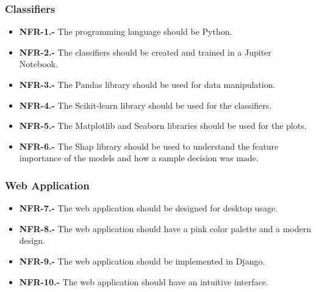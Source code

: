 \subsubsection{Classifiers}

\begin{itemize}
    \item \textbf{NFR-1.-} The programming language should be Python.
    \item \textbf{NFR-2.-} The classifiers should be created and trained in a Jupiter Notebook.
    \item \textbf{NFR-3.-} The Pandas library should be used for data manipulation.
    \item \textbf{NFR-4.-} The Scikit-learn library should be used for the classifiers.
    \item \textbf{NFR-5.-} The Matplotlib and Seaborn libraries should be used for the plots.
    \item \textbf{NFR-6.-} The Shap library should be used to understand the feature importance of the models and how a sample decision was made.
\end{itemize}

\subsubsection{Web Application}

\begin{itemize}
    \item \textbf{NFR-7.-} The web application should be designed for desktop usage.
    \item \textbf{NFR-8.-} The web application should have a pink color palette and a modern design.
    \item \textbf{NFR-9.-} The web application should be implemented in Django.
    \item \textbf{NFR-10.-} The web application should have an intuitive interface.
\end{itemize}